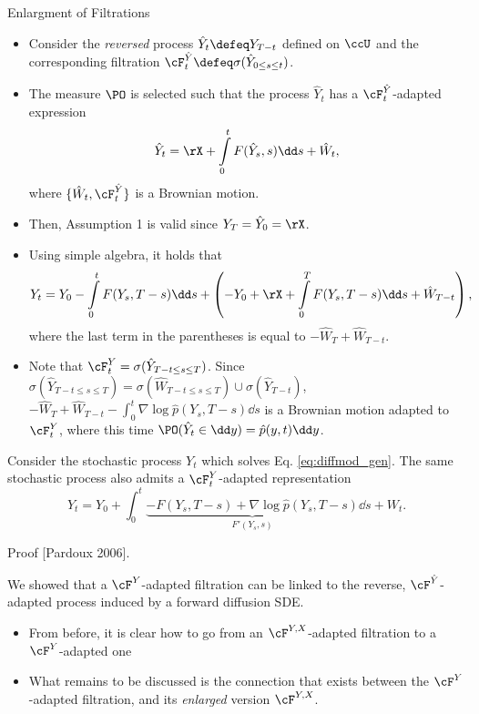 \begin{frame}[allowframebreaks]{Enlargment of Filtrations}

	
    \begin{itemize}
    \item Consider the \textit{{reversed}} process $\hat{Y}_t\defeq Y_{T-t}$ defined on $\ccU$ and the corresponding filtration $\cF_t^{\hat{Y}}\defeq\sigma(\hat{Y}_{0\leq s\leq t})$. 
    \item The measure $\PO$ is selected such that the process $\hat{Y}_t$ has a $\cF_t^{\hat{Y}}$-adapted expression
	\begin{equation}\label{eq:diffmod_gen}
		\hat{Y}_t=\rX+\int\limits_{0}^t F(\hat{Y}_{s},s)\dd s+\hat{W}_t,%
	\end{equation}
	where $\{\hat{W}_t,\cF_t^{\hat{Y}}\}$ is a Brownian motion. 
    \item Then, Assumption 1 is valid since $Y_T=\hat{Y}_0=\rX$. 
    \item Using simple algebra, it holds that 
	$$Y_{t}=Y_0-\int\limits_{0}^{t} F(Y_{s},T-s)\dd s+\left(-Y_0+ \rX+\int\limits_{0}^{T} F(Y_{s},T-s)\dd s+\hat{W}_{T-t}\right),$$ 
	where the last term in the parentheses is equal to $-\hat{W}_T+\hat{W}_{T-t}$. 
	
\item 	Note that $\cF_t^{Y}=\sigma(\hat{Y}_{T-t\leq s\leq T})$. %
	Since $\sigma(\hat{Y}_{T-t\leq s\leq T})=\sigma(\hat{W}_{T-t\leq s\leq T})\cup \sigma(\hat{Y}_{T-t})$, $-\hat{W}_T+\hat{W}_{T-t}-\int_0^t\nabla\log \hat{p}(Y_s,T-s)\dd s$ is a Brownian motion adapted to $\cF^Y_t$, where this time $\PO(\hat{Y}_t\in \dd y)=\hat{p}(y,t)\dd y$. 
  \end{itemize}  
  \framebreak
  \begin{Theorem}\label{anders_thm}
		Consider the stochastic process $Y_t$ which solves Eq. \ref{eq:diffmod_gen}. The same stochastic process also admits a $\cF^Y_t$-adapted representation
		\begin{equation}\label{eq:songsde_gen}
			Y_t=Y_0+\int_0^t \underbrace{-F(Y_s,T-s)+\nabla\log \hat{p}(Y_s,T-s)}_{ F'(Y_s,s)}\dd s  +W_t.
		\end{equation}
	\end{Theorem}
Proof [Pardoux 2006].

We showed that a $\cF^Y$-adapted filtration can be linked to the reverse, $\cF^{\hat{Y}}$-adapted process induced by a forward diffusion \gls{SDE}.
 \framebreak
 \begin{itemize}
     \item From before, it is clear how to go from an $\cF^{Y,X}$-adapted filtration to a $\cF^Y$-adapted one
     \item What remains to be discussed is the connection that exists between the $\cF^Y$-adapted filtration, and its \textit{{enlarged}} version $\cF^{Y,X}$.
 \end{itemize}
\framebreak


\end{frame}
